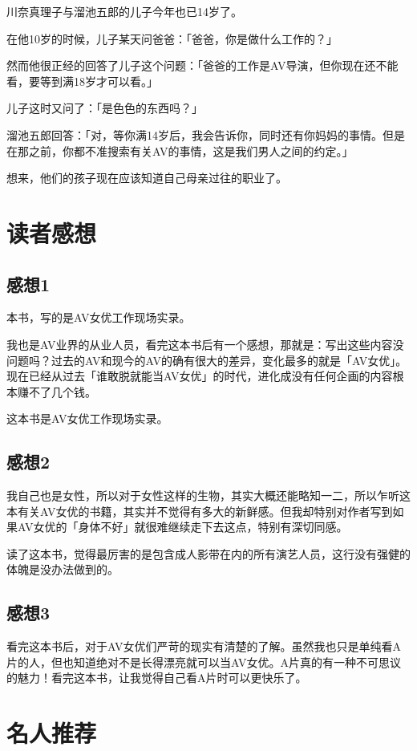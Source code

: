 \documentclass[12pt,UTF8]{ctexbook}
\begin{document}
川奈真理子与溜池五郎的儿子今年也已14岁了。

在他10岁的时候，儿子某天问爸爸：「爸爸，你是做什么工作的？」

然而他很正经的回答了儿子这个问题：「爸爸的工作是AV导演，但你现在还不能看，要等到满18岁才可以看。」

儿子这时又问了：「是色色的东西吗？」

溜池五郎回答：「对，等你满14岁后，我会告诉你，同时还有你妈妈的事情。但是在那之前，你都不准搜索有关AV的事情，这是我们男人之间的约定。」

想来，他们的孩子现在应该知道自己母亲过往的职业了。

\chapter{读者感想}

\section{感想1}

本书，写的是AV女优工作现场实录。

我也是AV业界的从业人员，看完这本书后有一个感想，那就是：写出这些内容没问题吗？过去的AV和现今的AV的确有很大的差异，变化最多的就是「AV女优」。现在已经从过去「谁敢脱就能当AV女优」的时代，进化成没有任何企画的内容根本赚不了几个钱。

这本书是AV女优工作现场实录。

\section{感想2}

我自己也是女性，所以对于女性这样的生物，其实大概还能略知一二，所以乍听这本有关AV女优的书籍，其实并不觉得有多大的新鲜感。但我却特别对作者写到如果AV女优的「身体不好」就很难继续走下去这点，特别有深切同感。

读了这本书，觉得最厉害的是包含成人影带在内的所有演艺人员，这行没有强健的体魄是没办法做到的。

\section{感想3}

看完这本书后，对于AV女优们严苛的现实有清楚的了解。虽然我也只是单纯看A片的人，但也知道绝对不是长得漂亮就可以当AV女优。A片真的有一种不可思议的魅力！看完这本书，让我觉得自己看A片时可以更快乐了。

\chapter{名人推荐}
\end{document}
